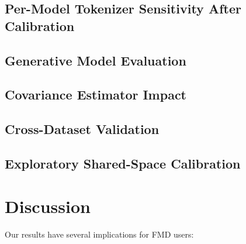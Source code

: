 \documentclass[a4paper]{article}
\begin{document}

\subsection{Per-Model Tokenizer Sensitivity After Calibration}


\subsection{Generative Model Evaluation}


\subsection{Covariance Estimator Impact}


\subsection{Cross-Dataset Validation}


\subsection{Exploratory Shared-Space Calibration}


\section{Discussion}
\label{sec:discussion}

Our results have several implications for FMD users:
\end{document}
